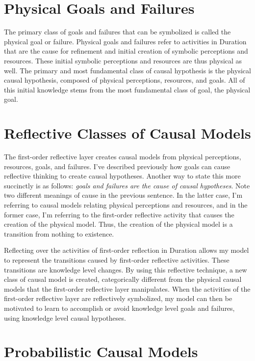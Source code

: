 \section{Physical Goals and Failures}

The primary class of goals and failures that can be symbolized is
called the physical goal or failure.  Physical goals and failures
refer to activities in Duration that are the cause for refinement and
initial creation of symbolic perceptions and resources.  These initial
symbolic perceptions and resources are thus physical as well.  The
primary and most fundamental class of causal hypothesis is the
physical causal hypothesis, composed of physical perceptions,
resources, and goals.  All of this initial knowledge stems from the
most fundamental class of goal, the physical goal.

\section{Reflective Classes of Causal Models}

The first-order reflective layer creates causal models from physical
perceptions, resources, goals, and failures.  I've described
previously how goals can cause reflective thinking to create causal
hypotheses.  Another way to state this more succinctly is as follows:
\emph{goals and failures are the cause of causal hypotheses}.  Note
two different meanings of cause in the previous sentence.  In the
latter case, I'm referring to causal models relating physical
perceptions and resources, and in the former case, I'm referring to
the first-order reflective activity that causes the creation of the
physical model.  Thus, the creation of the physical model is a
transition from nothing to existence.

Reflecting over the activities of first-order reflection in Duration
allows my model to represent the transitions caused by first-order
reflective activities.  These transitions are knowledge level changes.
By using this reflective technique, a new class of causal model is
created, categorically different from the physical causal models that
the first-order reflective layer manipulates.  When the activities of
the first-order reflective layer are reflectively symbolized, my model
can then be motivated to learn to accomplish or avoid knowledge level
goals and failures, using knowledge level causal hypotheses.

\section{Probabilistic Causal Models}

